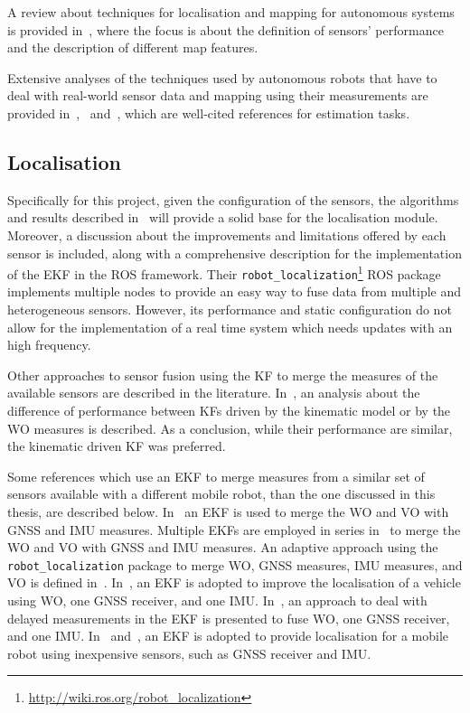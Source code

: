 \noindent
A review about techniques for localisation and mapping for autonomous systems is provided in~\cite{9065135}, where the focus is about the definition of sensors' performance and the description of different map features.

Extensive analyses of the techniques used by autonomous robots that have to deal with real-world sensor data and mapping using their measurements are provided in~\cite{thrun_probabilistic_2005},~\cite{gustafsson_statistical_2010} and~\cite{mitchell2007multi}, which are well-cited references for estimation tasks.

\subsection{Localisation}

Specifically for this project, given the configuration of the sensors, the algorithms and results described in~\cite{moore_generalized_2016} will provide a solid base for the localisation module.
Moreover, a discussion about the improvements and limitations offered by each sensor is included, along with a comprehensive description for the implementation of the \gls{EKF} in the \gls{ROS} framework.
Their \texttt{robot\_localization}\footnote{\url{http://wiki.ros.org/robot_localization}} ROS package implements multiple nodes to provide an easy way to fuse data from multiple and heterogeneous sensors.
However, its performance and static configuration do not allow for the implementation of a real time system which needs updates with an high frequency.

Other approaches to sensor fusion using the \gls{KF} to merge the measures of the available sensors are described in the literature.
In~\cite{801027}, an analysis about the difference of performance between \glspl{KF} driven by the  kinematic model or by the \gls{WO} measures is described. As a conclusion, while their performance are similar, the kinematic driven \gls{KF} was preferred.


Some references which use an \gls{EKF} to merge measures from a similar set of sensors available with a different mobile robot, than the one discussed in this thesis, are described below.
In~\cite{9024731} an \gls{EKF} is used to merge the \gls{WO} and \gls{VO} with \gls{GNSS} and \gls{IMU} measures.
Multiple \glspl{EKF} are employed in series in~\cite{9075286} to merge the \gls{WO} and \gls{VO} with \gls{GNSS} and \gls{IMU} measures.
An adaptive approach using the \texttt{robot\_localization} package to merge \gls{WO}, \gls{GNSS} measures, \gls{IMU} measures, and \gls{VO} is defined in~\cite{CHEN1298238}.
In~\cite{magnusson_improving_2012}, an \gls{EKF} is adopted to improve the localisation of a vehicle using \gls{WO}, one \gls{GNSS} receiver, and one \gls{IMU}.
In~\cite{8c506f630d4e478dace903637fa0a75b}, an approach to deal with delayed measurements in the \gls{EKF} is presented to fuse \gls{WO}, one \gls{GNSS} receiver, and one \gls{IMU}.
In~\cite{king_low_2008} and~\cite{skog2005low}, an \gls{EKF} is adopted to provide localisation for a mobile robot using inexpensive sensors, such as \gls{GNSS} receiver and \gls{IMU}.

